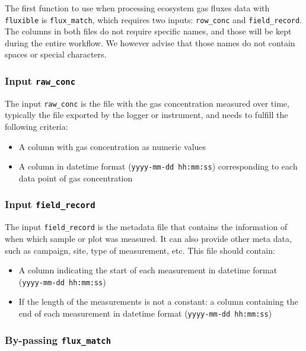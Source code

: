 \documentclass[
  letterpaper,
  DIV=11,
  numbers=noendperiod]{scrartcl}
\providecommand{\tightlist}{%
  \setlength{\itemsep}{0pt}\setlength{\parskip}{0pt}}\usepackage{longtable,booktabs,array}
\begin{document}
The first function to use when processing ecosystem gas fluxes data with
\texttt{fluxible} is \texttt{flux\_match}, which requires two inputs:
\texttt{row\_conc} and \texttt{field\_record}. The columns in both files
do not require specific names, and those will be kept during the entire
workflow. We however advise that those names do not contain spaces or
special characters.

\subsubsection{\texorpdfstring{Input
\texttt{raw\_conc}}{Input raw\_conc}}\label{input-raw_conc}

The input \texttt{raw\_conc} is the file with the gas concentration
measured over time, typically the file exported by the logger or
instrument, and needs to fulfill the following criteria:

\begin{itemize}
\tightlist
\item
  A column with gas concentration as numeric values
\item
  A column in datetime format (\texttt{yyyy-mm-dd\ hh:mm:ss})
  corresponding to each data point of gas concentration
\end{itemize}

\subsubsection{\texorpdfstring{Input
\texttt{field\_record}}{Input field\_record}}\label{input-field_record}

The input \texttt{field\_record} is the metadata file that contains the
information of when which sample or plot was measured. It can also
provide other meta data, such as campaign, site, type of measurement,
etc. This file should contain:

\begin{itemize}
\tightlist
\item
  A column indicating the start of each measurement in datetime format
  (\texttt{yyyy-mm-dd\ hh:mm:ss})
\item
  If the length of the measurements is not a constant: a column
  containing the end of each measurement in datetime format
  (\texttt{yyyy-mm-dd\ hh:mm:ss})
\end{itemize}

\subsubsection{\texorpdfstring{By-passing
\texttt{flux\_match}}{By-passing flux\_match}}\label{by-passing-flux_match}
\end{document}
